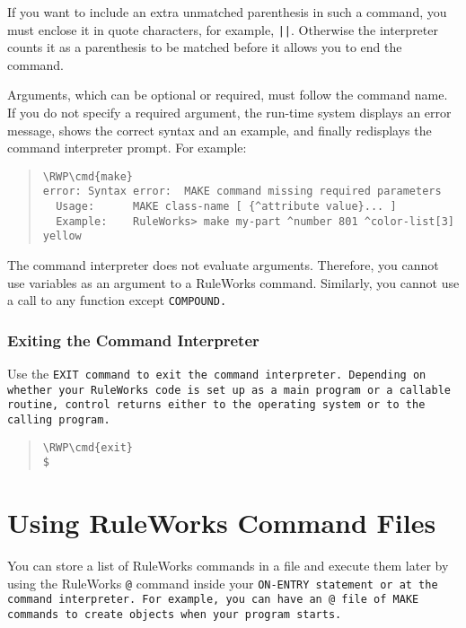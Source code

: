 If you want to include an extra unmatched parenthesis in such a
command, you must enclose it in quote characters, for example,
\verb,||,. Otherwise the interpreter counts it as a parenthesis to be
matched before it allows you to end the command.

Arguments, which can be optional or required, must follow the
command name. If you do not specify a required argument, the
run-time system displays an error message, shows the correct
syntax and an example, and finally redisplays the command
interpreter prompt. For example:

\begin{quote}
\begin{Verbatim}[commandchars=\\\{\}]
\RWP\cmd{make}
error: Syntax error:  MAKE command missing required parameters
  Usage:      MAKE class-name [ {^attribute value}... ]
  Example:    RuleWorks> make my-part ^number 801 ^color-list[3] yellow
\end{Verbatim}
\end{quote}

\begin{note}
  The command interpreter does not evaluate arguments.  Therefore, you
  cannot use variables as an argument to a RuleWorks
  command. Similarly, you cannot use a call to any function except
  \tt{COMPOUND}.
\end{note}

\subsubsection{Exiting the Command Interpreter}

Use the \tt{EXIT} command to exit the command interpreter. Depending
on whether your RuleWorks code is set up as a main program or a
callable routine, control returns either to the operating system or to
the calling program.

\begin{quote}
\begin{Verbatim}[commandchars=\\\{\}]
\RWP\cmd{exit}
$
\end{Verbatim}
\end{quote}

\section{Using RuleWorks Command Files}

You can store a list of RuleWorks commands in a file and execute them
later by using the RuleWorks \verb|@| command inside your
\tt{ON-ENTRY} statement or at the command interpreter. For example,
you can have an \verb|@| file of \tt{MAKE} commands to create objects
when your program starts.

